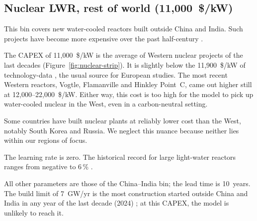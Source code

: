 \subsection{Nuclear LWR, rest of world (11,000~\$/kW)}\label{sec:nuclear-lwr-row}

This bin covers new water-cooled reactors built outside China and India.
Such projects have become more expensive over the past half-century \citep{eashgates2020}.

The CAPEX of 11,000~\$/kW is the average of Western nuclear projects of the last decades (Figure~\ref{fig:nuclear-strip}).
It is slightly below the 11,900~\$/kW of technology-data \citep{technologydata}, the usual source for European studies.
The most recent Western reactors, Vogtle, Flamanville and Hinkley Point~C, came out higher still at 12,000--22,000~\$/kW.
Either way, this cost is too high for the model to pick up water-cooled nuclear in the West, even in a carbon-neutral setting.

Some countries have built nuclear plants at reliably lower cost than the West, notably South Korea \citep{lovering2016} and Russia.
We neglect this nuance because neither lies within our regions of focus.

The learning rate is zero.
The historical record for large light-water reactors ranges from negative to 6\,\% \citep{rubin2015,eashgates2020}.

All other parameters are those of the China--India bin; the lead time is 10~years.
The build limit of 7~GW/yr is the most construction started outside China and India in any year of the last decade (2024) \citep{gem2026}; at this CAPEX, the model is unlikely to reach it.
